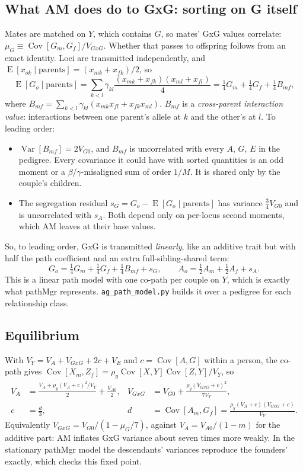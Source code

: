 \documentclass[11pt]{article}
\newcommand{\Cov}{\operatorname{Cov}}
\newcommand{\Var}{\operatorname{Var}}
\newcommand{\E}{\operatorname{E}}
\newcommand{\VA}{V_A}
\newcommand{\VG}{V_{GxG}}
\begin{document}
\subsection{What AM does do to GxG: sorting on G itself}
Mates are matched on $Y$, which contains $G$, so mates' GxG values correlate:
$\mu_G\equiv\Cov[G_m,G_f]/\VG$. Whether that passes to offspring follows from an exact identity. Loci are
transmitted independently, and $\E[x_{ok}\mid\text{parents}]=(x_{mk}+x_{fk})/2$, so
\begin{equation}\label{eq:Gtransmit}
\E[G_o\mid \text{parents}]=\sum_{k<l}\gamma_{kl}\frac{(x_{mk}+x_{fk})(x_{ml}+x_{fl})}{4}
=\tfrac14 G_m+\tfrac14 G_f+\tfrac14 B_{mf},
\end{equation}
where $B_{mf}=\sum_{k<l}\gamma_{kl}(x_{mk}x_{fl}+x_{fk}x_{ml})$.
$B_{mf}$ is a \emph{cross-parent interaction value}: interactions between one parent's allele at $k$ and the
other's at $l$. To leading order:
\begin{itemize}
  \item $\Var[B_{mf}]=2V_{G0}$, and $B_{mf}$ is uncorrelated with every $A$, $G$, $E$ in the pedigree. Every
    covariance it could have with sorted quantities is an odd moment or a $\beta$/$\gamma$-misaligned sum of
    order $1/M$. It is shared only by the couple's children.
  \item The segregation residual $s_G=G_o-\E[G_o\mid\text{parents}]$ has variance $\frac34 V_{G0}$ and is
    uncorrelated with $s_A$. Both depend only on per-locus second moments, which AM leaves at their base
    values.
\end{itemize}
So, to leading order, GxG is transmitted \emph{linearly}, like an additive trait but with half the path
coefficient and an extra full-sibling-shared term:
\[
G_o=\tfrac14 G_m+\tfrac14 G_f+\tfrac14 B_{mf}+s_G,\qquad A_o=\tfrac12 A_m+\tfrac12 A_f+s_A .
\]
This is a linear path model with one co-path per couple on $Y$, which is exactly what pathMgr represents.
\texttt{ag\_path\_model.py} builds it over a pedigree for each relationship class.

\subsection{Equilibrium}
With $V_Y=\VA+\VG+2c+V_E$ and $c=\Cov[A,G]$ within a person, the co-path gives
$\Cov[X_m,Z_f]=\rho_y\Cov[X,Y]\Cov[Z,Y]/V_Y$, so
\begin{align*}
\VA&=\frac{\VA+\rho_y(\VA+c)^2/V_Y}{2}+\frac{V_{A0}}2, &
\VG&=V_{G0}+\frac{\rho_y(\VG+c)^2}{7V_Y},\\
c&=\frac{d}{3}, &
d&=\Cov[A_m,G_f]=\frac{\rho_y(\VA+c)(\VG+c)}{V_Y}.
\end{align*}
Equivalently $\VG=V_{G0}/(1-\mu_G/7)$, against $\VA=V_{A0}/(1-m)$ for the additive part: AM inflates GxG
variance about seven times more weakly. In the stationary pathMgr model the descendants' variances reproduce
the founders' exactly, which checks this fixed point.
\end{document}
